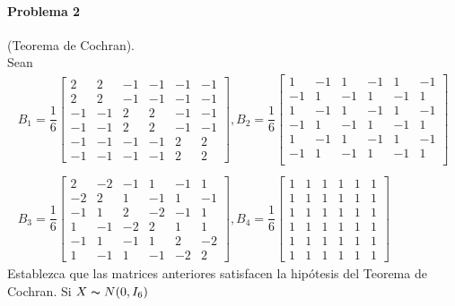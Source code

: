 \documentclass[12pt,a4paper]{report}
\begin{document}
\paragraph{Problema 2}  (Teorema de Cochran).\\

 Sean 
 \begin{align*}
 B_1 = \dfrac{1}{6}
 \begin{bmatrix}
 2  & 2  & -1 & -1 & -1 & -1\\
  2  & 2  & -1 & -1 & -1 & -1\\
 -1 & -1 & 2  & 2 & -1 & -1\\
 -1 & -1 & 2  & 2 & -1 & -1\\
 -1 & -1 & -1 & -1 & 2  & 2\\
 -1 & -1 & -1 & -1 & 2  & 2 
 \end{bmatrix}, 
B_2 = \dfrac{1}{6} \begin{bmatrix}
1 & -1 & 1 & -1 & 1 & -1 \\
-1 & 1 & -1 & 1 & -1 & 1 \\
1 & -1 & 1 & -1 & 1 & -1 \\
-1 & 1 & -1 & 1 & -1 & 1 \\  
1 & -1 & 1 & -1 & 1 & -1 \\
-1 & 1 & -1 & 1 & -1 & 1 \\
 \end{bmatrix} \\\\
B_3 = \dfrac{1}{6} \begin{bmatrix} 
2 & -2 & -1 & 1 & -1 & 1\\
-2 & 2 & 1 & -1 & 1 & -1\\
-1 & 1 & 2 & -2 & -1& 1\\
1 & -1 & -2 & 2 & 1 & 1\\
-1 & 1 & -1 & 1 & 2 & -2\\
1 & -1 & 1 & -1 & -2 & 2
\end{bmatrix}, 
B_4 = \dfrac{1}{6} \begin{bmatrix} 
1 & 1 & 1 & 1 & 1 & 1\\
1 & 1 & 1 & 1 & 1 & 1\\
1 & 1 & 1 & 1 & 1 & 1\\
1 & 1 & 1 & 1 & 1 & 1\\
1 & 1 & 1 & 1 & 1 & 1\\
1 & 1 & 1 & 1 & 1 & 1
\end{bmatrix}
 \end{align*}
 Establezca que las matrices anteriores satisfacen la hipótesis del 
Teorema de Cochran. Si $X \thicksim N (0, I_6)$\\
 
\end{document}
